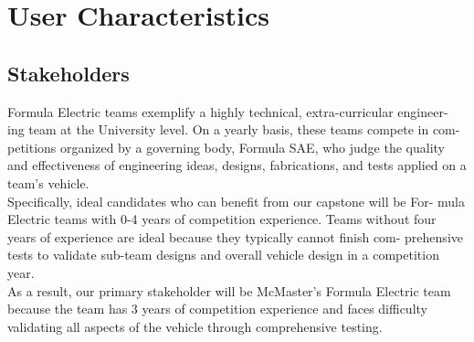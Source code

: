\documentclass[12pt]{article}
\begin{document}
\section{User Characteristics}

\subsection{Stakeholders}

Formula Electric teams exemplify a highly technical, extra-curricular engineer-
ing team at the University level. On a yearly basis, these teams compete in com-
petitions organized by a governing body, Formula SAE, who judge the quality
and effectiveness of engineering ideas, designs, fabrications, and tests applied
on a team’s vehicle.\\ 

Specifically, ideal candidates who can benefit from our capstone will be For-
mula Electric teams with 0-4 years of competition experience. Teams without
four years of experience are ideal because they typically cannot finish com-
prehensive tests to validate sub-team designs and overall vehicle design in a
competition year.\\ 

As a result, our primary stakeholder will be McMaster’s Formula Electric
team because the team has 3 years of competition experience and faces difficulty
validating all aspects of the vehicle through comprehensive testing.

\newpage
\end{document}
